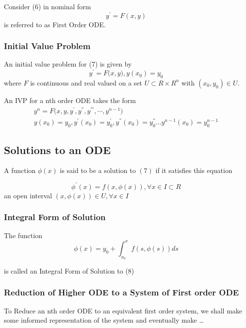 \documentclass{article}
\begin{document}
Consider (6) in nominal form
\begin{equation}
    y^{'} = F(x,y)
\end{equation}
is referred to as First Order ODE.

\subsubsection*{Initial Value Problem}
An initial value problem for (7) is given by
\begin{equation}
    y^{'} = F\biggl(x,y\biggr), y(x_{0}) = y_{0}
\end{equation}
where $F$ is continuous and real valued on a set $U \subset R \times R^{n}$ with $(x_{0},y_{0}) \in U$.

An IVP for a nth order ODE  takes the form
\begin{equation}
   \begin{split}
    y^{n} = F\biggl(x,y,y^{'},y^{''},y^{'''}, \dotsm ,y^{n-1}\biggr) \\
    y(x_{0}) = y_{0}, y^{'}(x_{0})=y^{'}_{0},y^{''}(x_{0})=y^{''}_{0} \dots y^{n-1}(x_{0})=y^{n-1}_{0}
   \end{split}
\end{equation}

\subsection*{Solutions to an ODE}
A function $\phi(x)$ is said to be a solution to $(7)$ if it satisfies this equation 

\begin{equation}
    \phi^{'}(x) = f(x,\phi(x)), \forall x \in I \subset R
\end{equation}
an open interval $(x,\phi(x)) \in U, \forall x \in I$

\subsubsection*{Integral Form of Solution}
The function
\begin{equation}
    \phi(x) = y_{0} + \int_{x_{0}}^{x}f(s, \phi(s))ds
\end{equation}

is called an Integral Form of Solution to (8)


\subsubsection*{Reduction of Higher ODE to a System of First order ODE}
To Reduce an nth order ODE to an equivalent first order system, we shall make some informed representation of the system and eventually make \dots
\end{document}
